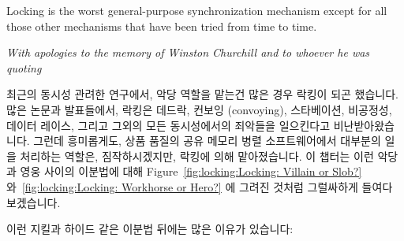 

\epigraph{Locking is the worst general-purpose synchronization mechanism
	  except for all those other mechanisms that
	  have been tried from time to time.}{\emph{With apologies
	  to the memory of Winston Churchill and to whoever he was
	  quoting}}

최근의 동시성 관려한 연구에서, 악당 역할을 맡는건 많은 경우 락킹이 되곤
했습니다.
많은 논문과 발표들에서, 락킹은 데드락, 컨보잉 (convoying), 스타베이션,
비공정성, 데이터 레이스, 그리고 그외의 모든 동시성에서의 죄악들을 일으킨다고
비난받아왔습니다.
그런데 흥미롭게도, 상품 품질의 공유 메모리 병렬 소프트웨어에서 대부분의 일을
처리하는 역할은, 짐작하시겠지만, 락킹에 의해 맡아졌습니다.
이 챕터는 이런 악당과 영웅 사이의 이분법에 대해 
Figure~\ref{fig:locking:Locking: Villain or Slob?}
와~\ref{fig:locking:Locking: Workhorse or Hero?} 에 그려진 것처럼 그럴싸하게
들여다 보겠습니다.

이런 지킬과 하이드 같은 이분법 뒤에는 많은 이유가 있습니다:

